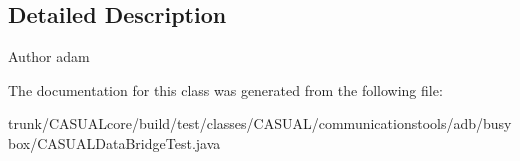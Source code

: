 \subsection{Detailed Description}
\begin{DoxyAuthor}{Author}
adam 
\end{DoxyAuthor}


The documentation for this class was generated from the following file\-:\begin{DoxyCompactItemize}
\item 
trunk/\-C\-A\-S\-U\-A\-Lcore/build/test/classes/\-C\-A\-S\-U\-A\-L/communicationstools/adb/busybox/C\-A\-S\-U\-A\-L\-Data\-Bridge\-Test.\-java\end{DoxyCompactItemize}
